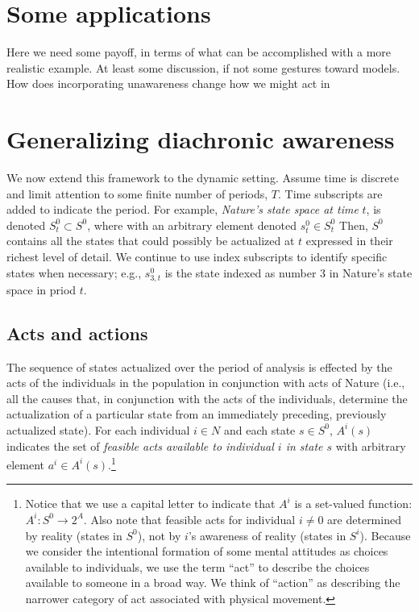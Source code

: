 \documentclass[
11pt,
titlepage,
reqno,
]{article}%
\theoremstyle{definition}
\begin{document}
\section{Some applications}
Here we need some payoff, in terms of what can be accomplished with a more realistic example. At least some discussion, if not some gestures toward models. How does incorporating unawareness change how we might act in


\section{Generalizing diachronic awareness}\label{sec:diachronic_setup}

We now extend this framework to the dynamic setting.
Assume time is discrete and limit attention to some finite number of periods, $T$. 
Time subscripts are added to indicate the period. For example, \textit{Nature's state space at time} $t$, is denoted $S^0_t\subset S^0$, where with an arbitrary element denoted $s^0_t\in S^0_t$
Then, $S^0$ contains all the states that could possibly be actualized at $t$ expressed in their richest level of detail.
We continue to use index subscripts to identify specific states when necessary; e.g., $s^0_{3,t}$ is the state indexed as number 3 in Nature's state space in priod $t.$


\subsection{Acts and actions\label{sec:dynamics}}
The sequence of states actualized over the period of analysis is effected by the acts of the individuals in the population in conjunction with acts of Nature (i.e., all the causes that, in conjunction with the acts of the individuals, determine the actualization of a particular state from an immediately preceding, previously actualized state).
For each individual $i\in N$ and each state $s\in S^0$,  $A^i(s)$ indicates the set of \textit{feasible acts available to individual $i$ in state $s$} with arbitrary element $a^i\in A^i(s)$.\footnote
{
	Notice that we use a capital letter to indicate that $A^i$ is a set-valued function: $A^i:S^0\rightarrow 2^A$.
	Also note that feasible acts for individual $i\ne 0$ are determined by reality (states in $S^0$), not by $i$'s awareness of reality (states in $S^i$).
	Because we consider the intentional formation of some mental attitudes as choices available to individuals, we use the term ``act'' to describe the choices available to someone in a broad way.
	We think of ``action'' as describing the narrower category of act associated with physical movement.
} 
	
\end{document}
